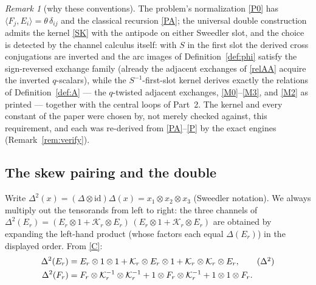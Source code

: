 \documentclass[11pt]{article}
\theoremstyle{definition}
\theoremstyle{remark}
\newtheorem{remark}[theorem]{Remark}
\newcommand{\la}{\langle}
\newcommand{\ra}{\rangle}
\newcommand{\del}{\delta}
\newcommand{\cK}{\mathcal K}
\newcommand{\tht}{\theta}
\begin{document}
\begin{remark}[why these conventions]\label{rem:whyC}
The problem's normalization \eqref{P0} has
$\la F_j,E_i\ra=\tht\,\del_{ij}$ and the classical recursion \eqref{PA};
the universal double construction admits the kernel \eqref{SK} with the
antipode on either Sweedler slot, and the choice is detected by the
channel calculus itself: with $S$ in the first slot the derived cross
conjugations are inverted and the arc images of
Definition~\ref{def:phi} satisfy the sign-reversed exchange family
(already the adjacent exchanges of \eqref{relAA} acquire the
inverted $q$-scalars), while the $S^{-1}$-first-slot kernel derives
exactly the relations of Definition~\ref{def:A} — the $q$-twisted
adjacent exchanges, \eqref{M0}--\eqref{M3}, and \eqref{M2} as printed —
together with the central loops of Part~2.  The kernel and every constant of the paper
were chosen by, not merely checked against, this requirement, and each
was re-derived from \eqref{PA}--\eqref{P} by the exact engines
(Remark~\ref{rem:verify}).
\end{remark}

\subsection{The skew pairing and the double}

Write $\Delta^2(x)=(\Delta\otimes\mathrm{id})\Delta(x)
=x_1\otimes x_2\otimes x_3$ (Sweedler notation).  We always multiply out
the tensorands from left to right: the three channels of
$\Delta^2(E_r)=(E_r\otimes1+\cK_r\otimes E_r)\,
(E_r\otimes1+\cK_r\otimes E_r)$ are obtained by expanding the left-hand
product (whose factors each equal $\Delta(E_r)$) in the displayed order.
From \eqref{C}:
\begin{align}
\Delta^2(E_r)&=E_r\otimes1\otimes1
  +\cK_r\otimes E_r\otimes1+\cK_r\otimes\cK_r\otimes E_r,
\label{DE}\tag{$\Delta^2$}\\
\Delta^2(F_r)&=F_r\otimes\cK_r^{-1}\otimes\cK_r^{-1}
  +1\otimes F_r\otimes\cK_r^{-1}+1\otimes1\otimes F_r .\notag
\end{align}
\end{document}
